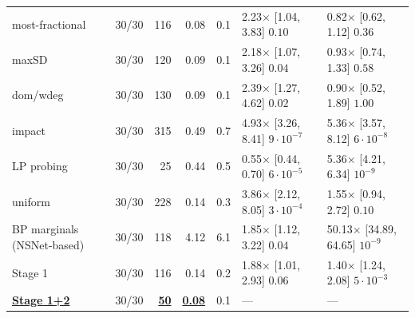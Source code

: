 \begin{table}[t]
{\begin{tabular}{lrrrrll}
most-fractional & 30/30 & 116 & 0.08 & 0.1 & 2.23$\times$ [1.04, 3.83] $0.10$ & 0.82$\times$ [0.62, 1.12] $0.36$ \\
maxSD & 30/30 & 120 & 0.09 & 0.1 & 2.18$\times$ [1.07, 3.26] $0.04$ & 0.93$\times$ [0.74, 1.33] $0.58$ \\
dom/wdeg & 30/30 & 130 & 0.09 & 0.1 & 2.39$\times$ [1.27, 4.62] $0.02$ & 0.90$\times$ [0.52, 1.89] $1.00$ \\
impact & 30/30 & 315 & 0.49 & 0.7 & 4.93$\times$ [3.26, 8.41] $9\cdot10^{-7}$ & 5.36$\times$ [3.57, 8.12] $6\cdot10^{-8}$ \\
LP probing & 30/30 & 25 & 0.44 & 0.5 & 0.55$\times$ [0.44, 0.70] $6\cdot10^{-5}$ & 5.36$\times$ [4.21, 6.34] $10^{-9}$ \\
uniform & 30/30 & 228 & 0.14 & 0.3 & 3.86$\times$ [2.12, 8.05] $3\cdot10^{-4}$ & 1.55$\times$ [0.94, 2.72] $0.10$ \\
BP marginals (NSNet-based) & 30/30 & 118 & 4.12 & 6.1 & 1.85$\times$ [1.12, 3.22] $0.04$ & 50.13$\times$ [34.89, 64.65] $10^{-9}$ \\
Stage 1 & 30/30 & 116 & 0.14 & 0.2 & 1.88$\times$ [1.01, 2.93] $0.06$ & 1.40$\times$ [1.24, 2.08] $5\cdot10^{-3}$ \\
\textbf{\underline{Stage 1+2}} & 30/30 & \textbf{\underline{50}} & \textbf{\underline{0.08}} & 0.1 & --- & --- \\
\bottomrule
\end{tabular}}
\end{table}